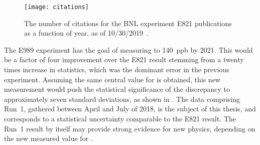 \begin{figure}
	\centering
	\texttt{[image: citations]}
	\caption[Citations for E821 publications vs year]{The number of citations for the BNL experiment E821 publications as a function of year, as of 10/30/2019~\cite{MarkComm}.}
	\label{fig:E821Citations}
\end{figure}


The E989 experiment has the goal of measuring \amu to \SI{140}{ppb} by 2021. This would be a factor of four improvement over the E821 result stemming from a twenty times increase in statistics, which was the dominant error in the previous experiment. Assuming the same central value for \amu is obtained, this new measurement would push the statistical significance of the discrepancy to approximately seven standard deviations, as shown in . The data comprising Run~1, gathered between April and July of 2018, is the subject of this thesis, and corresponds to a statistical uncertainty comparable to the E821 result. The Run~1 result by itself may provide strong evidence for new physics, depending on the new measured value for \amu.










